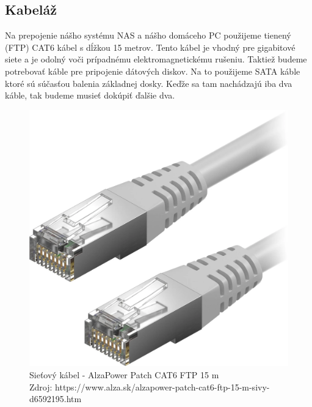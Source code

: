 \documentclass[12pt,oneside,slovak,a4paper]{article}
\begin{document}
\subsection{Kabeláž}
Na prepojenie nášho systému NAS a nášho domáceho PC použijeme tienený (FTP) CAT6 kábel s dĺžkou 15 metrov. Tento kábel je vhodný pre gigabitové siete a je odolný voči prípadnému elektromagnetickému rušeniu. Taktiež budeme potrebovať káble pre pripojenie dátových diskov. Na to použijeme SATA káble ktoré sú súčasťou balenia základnej dosky. Keďže sa tam nachádzajú iba dva káble, tak budeme musieť dokúpiť ďalšie dva.

\begin{figure}[H]
	\centering
	\captionsetup{justification=centering,margin=2cm}
	\includegraphics[scale=0.1]{./images/ftp.png} %
	\centering
	\caption{Sieťový kábel - AlzaPower Patch CAT6 FTP 15 m \\ Zdroj: https://www.alza.sk/alzapower-patch-cat6-ftp-15-m-sivy-d6592195.htm}
\end{figure}
\end{document}
